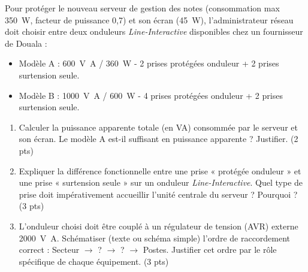 \documentclass[11pt]{article}
\begin{document}
\begin{exercice}
Pour protéger le nouveau serveur de gestion des notes (consommation max \SI{350}{\watt}, facteur de puissance 0,7) et son écran (\SI{45}{\watt}), l'administrateur réseau doit choisir entre deux onduleurs \textit{Line-Interactive} disponibles chez un fournisseur de Douala :
\begin{itemize}
    \item Modèle A : \SI{600}{\volt\ampere} / \SI{360}{\watt} - 2 prises protégées onduleur + 2 prises surtension seule.
    \item Modèle B : \SI{1000}{\volt\ampere} / \SI{600}{\watt} - 4 prises protégées onduleur + 2 prises surtension seule.
\end{itemize}
\begin{enumerate}
    \item Calculer la puissance apparente totale (en VA) consommée par le serveur et son écran. Le modèle A est-il suffisant en puissance apparente ? Justifier. (2 pts)
    \item Expliquer la différence fonctionnelle entre une prise « protégée onduleur » et une prise « surtension seule » sur un onduleur \textit{Line-Interactive}. Quel type de prise doit impérativement accueillir l'unité centrale du serveur ? Pourquoi ? (3 pts)
    \item L'onduleur choisi doit être couplé à un régulateur de tension (AVR) externe \SI{2000}{\volt\ampere}. Schématiser (texte ou schéma simple) l'ordre de raccordement correct : Secteur $\rightarrow$ ? $\rightarrow$ ? $\rightarrow$ Postes. Justifier cet ordre par le rôle spécifique de chaque équipement. (3 pts)
\end{enumerate}
\end{exercice}
\end{document}

